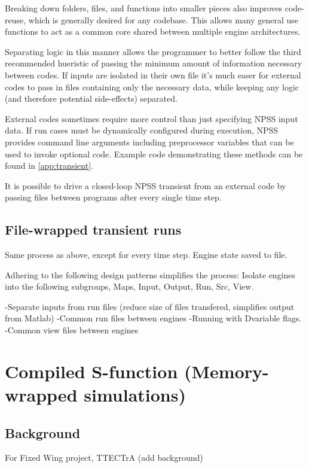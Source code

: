 \documentclass[heading.tex]{subfiles}
\begin{document}
Breaking down folders, files, and functions into smaller pieces also improves code-reuse,
which is generally desired for any codebase.
This allows many general use functions to act as a common core shared between multiple engine architectures.

Separating logic in this manner allows the programmer to better follow the third recommended hueristic
of passing the minimum amount of information necessary between codes. If inputs are isolated in their own file
it's much easer for external codes to pass in files containing only the necessary data, 
while keeping any logic (and therefore potential side-effects) separated.

External codes sometimes require more control than just specifying NPSS input data.
If run cases must be dynamically configured during execution,
NPSS provides command line arguments \cite[chap.~2.1]{NPSS}
including preprocessor variables that can be used to invoke optional code.
Example code demonstrating these methods can be found in \cref{app:transient}.

It is possible to drive a closed-loop NPSS transient from an external code
by passing files between programs after every single time step.

\subsection{File-wrapped transient runs}


Same process as above, except for every time step. Engine state saved to file.

Adhering to the following design patterns simplifies the process:
Isolate engines into the following subgroups, Maps, Input, Output, Run, Src, View.

-Separate inputs from run files (reduce size of files transfered, simplifies output from Matlab)
-Common run files between engines -Running with Dvariable flags.
-Common view files between engines



\section{Compiled S-function (Memory-wrapped simulations)}
\subsection{Background}
For Fixed Wing project, TTECTrA (add background)
\end{document}
